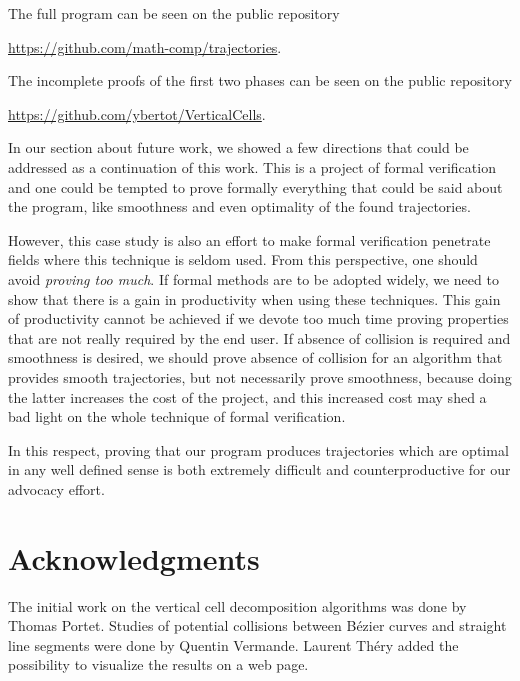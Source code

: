 \documentclass{llncs}
\begin{document}
The full program can be seen on the public repository
\begin{center}
\url{https://github.com/math-comp/trajectories}.
\end{center}
The incomplete proofs of the first two phases can be seen on the public
repository
\begin{center}
\url{https://github.com/ybertot/VerticalCells}.
\end{center}

In our section about future work, we showed a few directions that
could be addressed as a continuation of this work.  This is a project
of formal verification and one could be tempted to prove formally
everything that could be said about the program, like smoothness and
even optimality of the found trajectories.

However, this case study is also an effort to make formal verification
penetrate fields where this technique is seldom used.  From this
perspective, one should avoid {\em proving too much}.  If formal
methods are to be adopted widely, we need to show that there is a gain
in productivity when using these techniques.  This gain of
productivity cannot be achieved if we devote too much time proving
properties that are not really required by the end user.  If absence
of collision is required and smoothness is desired, we should prove
absence of collision for an algorithm that provides smooth
trajectories, but not necessarily prove smoothness, because doing the
latter increases the cost of the project, and this increased cost may
shed a bad light on the whole technique of formal verification.

In this respect, proving that our program produces trajectories which
are optimal in any well defined sense is both extremely difficult and
counterproductive for our advocacy effort.
\section*{Acknowledgments}
The initial work on the vertical cell decomposition algorithms was
done by Thomas Portet.  Studies of potential collisions between Bézier
curves and straight line segments were done by Quentin Vermande.
Laurent Théry added the possibility to visualize the results on a
web page.



\end{document}
